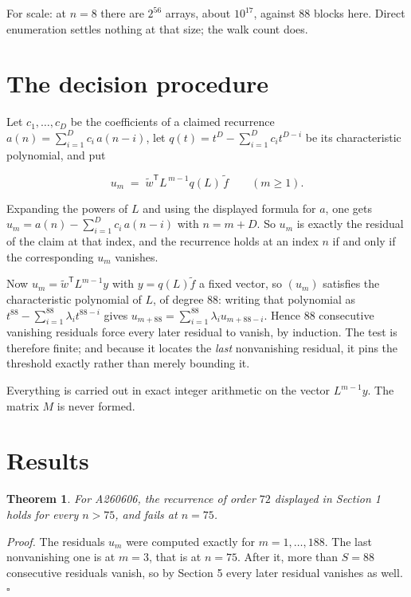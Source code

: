 \documentclass[11pt]{article}
\newtheorem{theorem}{Theorem}
\theoremstyle{definition}
\begin{document}
For scale: at $n = 8$ there are $2^{56}$ arrays, about $10^{17}$, against $88$ blocks here. Direct enumeration settles nothing at that size; the walk count does.

\section{The decision procedure}

Let $c_1,\dots,c_D$ be the coefficients of a claimed recurrence $a(n) = \sum_{i=1}^{D} c_i\,a(n-i)$, let $q(t) = t^{D} - \sum_{i=1}^{D} c_i t^{D-i}$ be its characteristic polynomial, and put

\[u_m \;=\; \tilde w^{\mathsf T} L^{\,m-1} q(L)\,\tilde f \qquad (m \ge 1).\]

Expanding the powers of $L$ and using the displayed formula for $a$, one gets $u_m = a(n) - \sum_{i=1}^{D} c_i\,a(n-i)$ with $n = m + D$. So $u_m$ is exactly the residual of the claim at that index, and the recurrence holds at an index $n$ if and only if the corresponding $u_m$ vanishes.

Now $u_m = \tilde w^{\mathsf T} L^{m-1} y$ with $y = q(L)\tilde f$ a fixed vector, so $(u_m)$ satisfies the characteristic polynomial of $L$, of degree $88$: writing that polynomial as $t^{88} - \sum_{i=1}^{88} \lambda_i t^{88-i}$ gives $u_{m+88} = \sum_{i=1}^{88} \lambda_i u_{m+88-i}$. Hence $88$ consecutive vanishing residuals force every later residual to vanish, by induction. The test is therefore finite; and because it locates the {\itshape last} nonvanishing residual, it pins the threshold exactly rather than merely bounding it.

Everything is carried out in exact integer arithmetic on the vector $L^{m-1}y$. The matrix $M$ is never formed.

\section{Results}

\begin{theorem} For A260606, the recurrence of order $72$ displayed in Section 1 holds for every $n > 75$, and fails at $n = 75$.\end{theorem}

{\itshape Proof.} The residuals $u_m$ were computed exactly for $m = 1,\dots,188$. The last nonvanishing one is at $m = 3$, that is at $n = 75$. After it, more than $S = 88$ consecutive residuals vanish, so by Section 5 every later residual vanishes as well. $\square$
\end{document}
